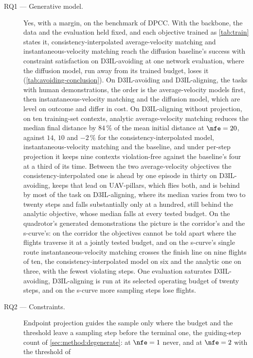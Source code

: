 \begin{description}
  \item[RQ1 --- Generative model.] Yes, with a margin, on the benchmark of \ac{DPCC}. With the
    backbone, the data and the evaluation held fixed, and each objective trained as \autoref{tab:train} states
    it, consistency-interpolated average-velocity
    matching and instantaneous-velocity matching reach the diffusion baseline's success with
    constraint satisfaction on D3IL-avoiding at one network evaluation, where the diffusion model,
    run away from its trained budget, loses it (\autoref{tab:avoiding-conclusion}). On D3IL-avoiding and
    D3IL-aligning, the tasks with human demonstrations, the order is the average-velocity models
    first, then instantaneous-velocity matching and the diffusion model, which are level on outcome
    and differ in cost. On D3IL-aligning without projection, on ten training-set contexts, analytic average-velocity matching
    reduces the median final distance by $84\,\%$ of the mean initial distance at $\nfe = 20$,
    against $14$, $10$ and $-2\,\%$ for the consistency-interpolated model, instantaneous-velocity
    matching and the baseline, and under per-step projection it keeps nine contexts violation-free
    against the baseline's four at a third of its time. Between the two average-velocity objectives
    the consistency-interpolated one is ahead by one episode in thirty on D3IL-avoiding, keeps that
    lead on UAV-pillars, which flies both, and is behind by most of the task on D3IL-aligning, where
    its median varies from two to twenty steps and falls substantially only at a hundred, still
    behind the analytic objective, whose median falls at every tested budget. On the quadrotor's
    generated demonstrations the picture is the corridor's and the s-curve's: on the corridor the
    objectives cannot be told apart where the flights traverse it at a jointly tested budget, and on
    the s-curve's single route instantaneous-velocity matching crosses the finish line on nine
    flights of ten, the consistency-interpolated model on six and the analytic one on three, with the
    fewest violating steps. One evaluation saturates D3IL-avoiding, D3IL-aligning is run at its
    selected operating budget of twenty steps, and on the s-curve more sampling steps lose flights.
  \item[RQ2 --- Constraints.] Endpoint projection guides the sample only where the budget and the
    threshold leave a sampling step before the terminal one, the guiding-step count of
    \autoref{sec:method:degenerate}: at $\nfe = 1$ never, and at $\nfe = 2$ with the threshold of

\end{description}

